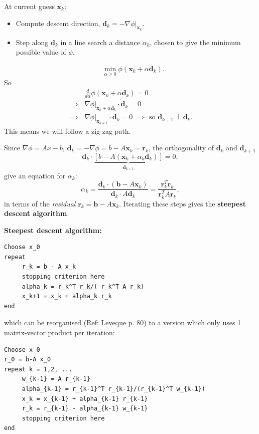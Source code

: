 \documentclass[12pt, a4paper]{article}
\renewcommand{\vec}[1]{\mathbf{#1}}
\theoremstyle{definition}
\theoremstyle{remark}
\numberwithin{equation}{section}
\begin{document}
At current guess $\vec{x}_k$: 
\begin{itemize}
\item Compute descent direction, $\vec{d}_k=-\nabla \phi\big|_{\vec{x}_k}$.
\item Step along $\vec{d}_k$ in a line search a distance $\alpha_k$, chosen to give the minimum possible value of $\phi$.
\end{itemize}
\begin{align*}
&\min_{\alpha \ge 0} \phi(\vec{x}_k+\alpha\vec{d}_k).
\end{align*}
So
\begin{align*}
 & \frac{d}{d\alpha} \phi(\vec{x}_k + \alpha\vec{d}_k)=0\\
\implies &\nabla\phi\big|_{\vec{x}_k+\alpha\vec{d}_k} \cdot \vec{d}_k=0\\
\implies& \nabla\phi\big|_{\vec{x}_{k+1}} \cdot \vec{d}_k =0
\implies \mbox{ so $\vec{d}_{k+1} \perp \vec{d}_k$}.
\end{align*}
This means we will follow a zig-zag path.

Since $\nabla \phi = Ax -b$, $\vec{d}_k = - \nabla \phi = b-A\vec{x}_k=\vec{r}_k$, the orthogonality of 
$\vec{d}_k$ and $\vec{d}_{k+1}$ 
\[\vec{d}_k \cdot \underbrace{[b-A(\vec{x}_k +\alpha_k\vec{d}_k)]}_{\vec{d}_{k+1}}=0,\]
give an equation for $\alpha_k$:
\begin{equation*}
\alpha_k=\frac{\vec{d}_k \cdot (\vec{b}-A\vec{x}_k)}{\vec{d}_k \cdot A\vec{d}_k} = \frac{\vec{r}_k^T \vec{r}_k}{\vec{r}_k^T A \vec{r}_k},
\end{equation*}
in terms of the \emph{residual} $\vec{r}_k = \vec{b}-A\vec{x}_k$.
Iterating these steps gives the {\bf  steepest descent algorithm}.



\newpage
{\bf  Steepest descent algorithm:}
\begin{verbatim}
Choose x_0
repeat
     r_k = b - A x_k
     stopping criterion here
     alpha_k = r_k^T r_k/( r_k^T A r_k)
     x_k+1 = x_k + alpha_k r_k
end
\end{verbatim}
which can be reorganised (Ref: Leveque p. 80) to a version which only uses 1 matrix-vector product per iteration:
\begin{verbatim}
Choose x_0
r_0 = b-A x_0
repeat k = 1,2, ...
     w_{k-1} = A r_{k-1}
     alpha_{k-1} = r_{k-1}^T r_{k-1}/(r_{k-1}^T w_{k-1})
     x_k = x_{k-1} + alpha_{k-1} r_{k-1}
     r_k = r_{k-1} - alpha_{k-1} w_{k-1}        
     stopping criterion here
end
\end{verbatim}
\end{document}
